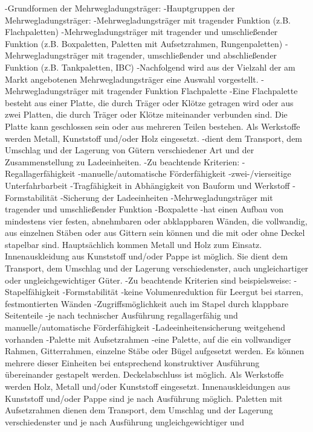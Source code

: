 -Grundformen der Mehrwegladungsträger:
        -Hauptgruppen der Mehrwegladungsträger:
            -Mehrwegladungsträger mit tragender Funktion (z.B. Flachpaletten)
            -Mehrwegladungsträger mit tragender und umschließender Funktion (z.B. Boxpaletten, Paletten mit Aufsetzrahmen, Rungenpaletten)
            -Mehrwegladungsträger mit tragender, umschließender und abschließender Funktion (z.B. Tankpaletten, IBC)
        -Nachfolgend wird aus der Vielzahl der am Markt angebotenen Mehrwegladungsträger eine Auswahl vorgestellt.
    -Mehrwegladungsträger mit tragender Funktion Flachpalette
        -Eine Flachpalette besteht aus einer Platte, die durch Träger oder Klötze getragen wird oder aus zwei Platten, die durch Träger oder Klötze miteinander verbunden sind. Die Platte kann geschlossen sein oder aus mehreren Teilen bestehen. Als Werkstoffe werden Metall, Kunststoff und/oder Holz eingesetzt. %
        -dient dem Transport, dem Umschlag und der Lagerung von Gütern verschiedener Art und der Zusammenstellung zu Ladeeinheiten.
        -Zu beachtende Kriterien:
            -Regallagerfähigkeit 
            -manuelle/automatische Förderfähigkeit
            -zwei-/vierseitige Unterfahrbarbeit 
            -Tragfähigkeit in Abhängigkeit von Bauform und Werkstoff
            -Formstabilität
            -Sicherung der Ladeeinheiten
    -Mehrwegladungsträger mit tragender und umschließender Funktion
        -Boxpalette
            -hat einen Aufbau von mindestens vier festen, abnehmbaren oder abklappbaren Wänden, die vollwandig, aus einzelnen Stäben oder aus Gittern sein können und die mit oder ohne Deckel stapelbar sind. Hauptsächlich kommen Metall und Holz zum Einsatz. Innenauskleidung aus Kunststoff und/oder Pappe ist möglich. Sie dient dem Transport, dem Umschlag und der Lagerung verschiedenster, auch ungleichartiger oder ungleichgewichtiger Güter.
            -Zu beachtende Kriterien sind beispielsweise:
                -Stapelfähigkeit 
                -Formstabilität 
                -keine Volumenreduktion für Leergut bei starren, festmontierten Wänden -Zugriffsmöglichkeit auch im Stapel durch klappbare Seitenteile 
                -je nach technischer Ausführung regallagerfähig und manuelle/automatische Förderfähigkeit 
                -Ladeeinheitensicherung weitgehend vorhanden
        -Palette mit Aufsetzrahmen
            -eine Palette, auf die ein vollwandiger Rahmen, Gitterrahmen, einzelne Stäbe oder Bügel aufgesetzt werden. Es können mehrere dieser Einheiten bei entsprechend konstruktiver Ausführung übereinander gestapelt werden. Deckelabschluss ist möglich. Als Werkstoffe werden Holz, Metall und/oder Kunststoff eingesetzt. Innenauskleidungen aus Kunststoff und/oder Pappe sind je nach Ausführung möglich. Paletten mit Aufsetzrahmen dienen dem Transport, dem Umschlag und der Lagerung verschiedenster und je nach Ausführung ungleichgewichtiger und
